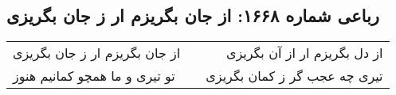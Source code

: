 \begin{center}
\section*{رباعی شماره ۱۶۶۸: از جان بگریزم ار ز جان بگریزی}
\label{sec:1668}
\begin{longtable}{l p{0.5cm} r}
از جان بگریزم ار ز جان بگریزی
&&
از دل بگریزم ار از آن بگریزی
\\
تو تیری و ما همچو کمانیم هنوز
&&
تیری چه عجب گر ز کمان بگریزی
\\
\end{longtable}
\end{center}
